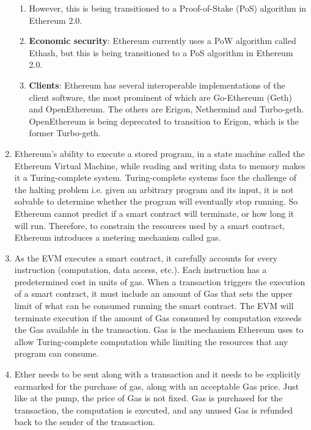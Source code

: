 \begin{enumerate}
\begin{enumerate}
\item However, this is being transitioned to a Proof-of-Stake (PoS) algorithm in Ethereum 2.0.

\item\textbf{Economic security}: Ethereum currently uses a PoW algorithm called Ethash, but this is being transitioned to a PoS algorithm in Ethereum 2.0.

\item\textbf{Clients}: Ethereum has several interoperable implementations of the client software, the most prominent of which are Go-Ethereum (Geth) and OpenEthereum. The others are Erigon, Nethermind and Turbo-geth. OpenEthereum is being deprecated to transition to Erigon, which is the former Turbo-geth.
\end{enumerate}

\item Ethereum's ability to execute a stored program, in a state machine called the Ethereum Virtual Machine, while reading and writing data to memory makes it a Turing-complete system. Turing-complete systems face the challenge of the halting problem i.e. given an arbitrary program and its input, it is not solvable to determine whether the program will eventually stop running. So Ethereum cannot predict if a smart contract will terminate, or how long it will run. Therefore, to constrain the resources used by a smart contract, Ethereum introduces a metering mechanism called gas.

\item As the EVM executes a smart contract, it carefully accounts for every instruction (computation, data access, etc.). Each instruction has a predetermined cost in units of gas. When a transaction triggers the execution of a smart contract, it must include an amount of Gas that sets the upper limit of what can be consumed running the smart contract. The EVM will terminate execution if the amount of Gas consumed by computation exceeds the Gas available in the transaction. Gas is the mechanism Ethereum uses to allow Turing-complete computation while limiting the resources that any program can consume.

\item Ether needs to be sent along with a transaction and it needs to be explicitly earmarked for the purchase of gas, along with an acceptable Gas price. Just like at the pump, the price of Gas is not fixed. Gas is purchased for the transaction, the computation is executed, and any unused Gas is refunded back to the sender of the transaction.


\end{enumerate}
